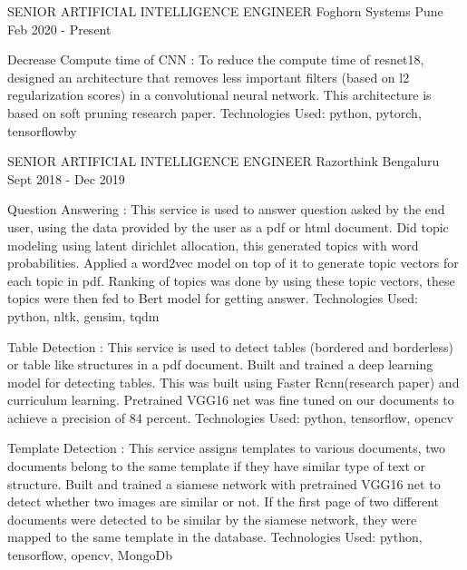 
\begin{cventries}

  \cventry
    {SENIOR ARTIFICIAL INTELLIGENCE ENGINEER} %
    {Foghorn Systems} %
    {Pune} %
    {Feb 2020 - Present} %
    {
      \begin{cvitems} %
      \item{Decrease Compute time of CNN :  To reduce the compute time of resnet18, designed an architecture that removes less important filters (based on l2 regularization scores) in a convolutional neural network. This architecture is based on soft pruning research paper. Technologies Used: python, pytorch, tensorflowby  }        
	\end{cvitems}
    }
  \cventry
    {SENIOR ARTIFICIAL INTELLIGENCE ENGINEER} %
    {Razorthink} %
    {Bengaluru} %
    {Sept 2018 - Dec 2019} %
    {
      \begin{cvitems} %
        \item{Question Answering : This service is used to answer question asked by the end user, using the data provided by the user as a pdf or html document. Did topic modeling using latent dirichlet allocation, this generated topics with word probabilities. Applied a word2vec model on top of it to generate topic vectors for each topic in pdf. Ranking of topics was done by using these topic vectors, these topics were then fed to Bert model for getting answer. Technologies Used: python, nltk, gensim, tqdm}        
        \item{Table Detection : This service is used to detect tables (bordered and borderless) or table like structures in a pdf document. Built and trained a deep learning model for detecting tables. This was built using Faster Rcnn(research paper) and curriculum learning. Pretrained VGG16 net was fine tuned on our documents to achieve a precision of 84 percent.  Technologies Used: python, tensorflow, opencv}        
        \item{Template Detection : This service assigns templates to various documents, two documents belong to the same template if they have similar type of text or structure. Built and trained a siamese network with pretrained VGG16 net to detect whether two images are similar or not. If the first page of two different documents were detected to be similar by the siamese network, they were mapped to the same template in the database. Technologies Used: python, tensorflow, opencv, MongoDb}        

\end{cvitems}}
\end{cventries}
